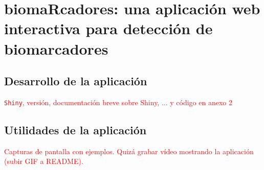 \chapter{biomaRcadores: una aplicación web interactiva para detección de biomarcadores}

\section{Desarrollo de la aplicación}

\textcolor{red}{\texttt{Shiny}, versión, documentación breve sobre Shiny, ... y código en anexo 2}

\section{Utilidades de la aplicación}

\textcolor{red}{Capturas de pantalla con ejemplos. Quizá grabar vídeo mostrando la aplicación (subir GIF a README).}